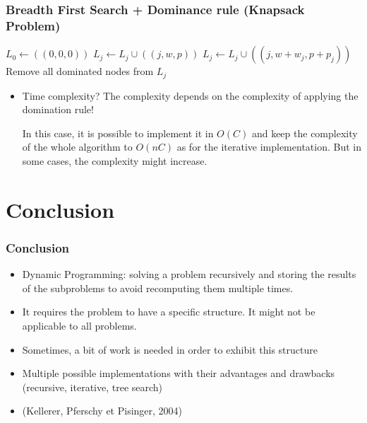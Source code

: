 \documentclass{beamer}
\begin{document}
\begin{frame}
  \frametitle{Breadth First Search + Dominance rule (Knapsack Problem)}

  \begin{algorithmic}
    \State $L_0 \gets ((0, 0, 0))$
    \State $L_j \gets L_j \cup ((j, w, p)) $
    \State $L_j \gets L_j \cup ((j, w + w_j, p + p_j))$
    \EndIf
    \EndFor
    \State \alert{Remove all dominated nodes from $L_j$}
    \EndFor
    \EndProcedure
  \end{algorithmic}

  \begin{itemize}
    \item \pause Time complexity? \pause The complexity depends on the complexity of applying the domination rule!

  In this case, it is possible to implement it in $O(C)$ and keep the complexity of the whole algorithm to $O(nC)$ as for the iterative implementation. But in some cases, the complexity might increase.
  \end{itemize}
\end{frame}

\section{Conclusion}

\begin{frame}
  \frametitle{Conclusion}

  \begin{itemize}
    \item Dynamic Programming: solving a problem recursively and storing the results of the subproblems to avoid recomputing them multiple times.
    \item It requires the problem to have a specific structure. It might not be applicable to all problems.
    \item Sometimes, a bit of work is needed in order to exhibit this structure
    \item Multiple possible implementations with their advantages and drawbacks (recursive, iterative, tree search)
    \item {} (Kellerer, Pferschy et Pisinger, 2004)
  \end{itemize}

\end{frame}

\maketitle
\end{document}

